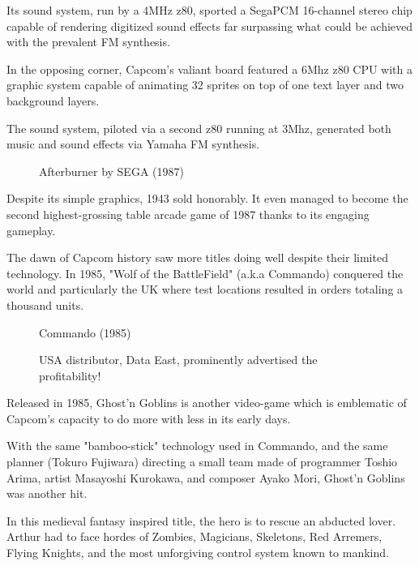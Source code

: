 Its sound system, run by a 4MHz z80, sported a SegaPCM 16-channel stereo chip capable of rendering digitized sound effects far surpassing what could be achieved with the prevalent FM synthesis.

In the opposing corner, Capcom's valiant board featured a 6Mhz z80 CPU with a graphic system capable of animating 32 sprites on top of one text layer and two background layers\cite{1942-tech_specs}. 

The sound system, piloted via a second z80 running at 3Mhz, generated both music and sound effects via Yamaha FM synthesis.




\begin{figure}[H]
\caption*{Afterburner by SEGA (1987)}
\end{figure}

Despite its simple graphics, 1943 sold honorably. It even managed to become the second highest-grossing table arcade game of 1987 thanks to its engaging gameplay. 

The dawn of Capcom history saw more titles doing well despite their limited technology. In 1985, "Wolf of the BattleField" (a.k.a Commando) conquered the world and particularly the UK where test locations resulted in orders totaling a thousand units\cite{cgm4}.

\begin{figure}[H]
\caption*{Commando (1985)}
\end{figure}


\vfill

\begin{figure}[!b]
\caption*{USA distributor, Data East, prominently advertised the profitability!}
\end{figure}
\pagebreak


Released in 1985, Ghost'n Goblins is another video-game which is emblematic of Capcom's capacity to do more with less in its early days. 

With the same "bamboo-stick" technology used in Commando, and the same planner (Tokuro Fujiwara) directing a small team made of programmer Toshio Arima, artist Masayoshi Kurokawa, and composer Ayako Mori, Ghost'n Goblins was another hit.

In this medieval fantasy inspired title, the hero is to rescue an abducted lover. Arthur had to face hordes of Zombies, Magicians, Skeletons, Red Arremers, Flying Knights, and the most unforgiving control system known to mankind.


